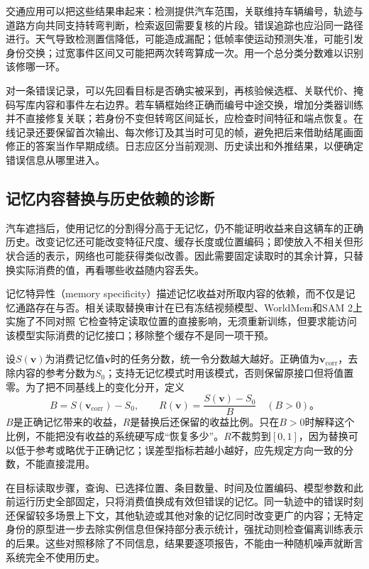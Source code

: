 交通应用可以把这些结果串起来：检测提供汽车范围，关联维持车辆编号，轨迹与道路方向共同支持转弯判断，检索返回需要复核的片段。错误追踪也应沿同一路径进行。天气导致检测置信降低，可能造成漏配；低帧率使运动预测失准，可能引发身份交换；过宽事件区间又可能把两次转弯算成一次。用一个总分类分数难以识别该修哪一环。

对一条错误记录，可以先回看目标是否确实被采到，再核验候选框、关联代价、掩码写库内容和事件左右边界。若车辆框始终正确而编号中途交换，增加分类器训练并不直接修复关联；若身份不变但转弯区间延长，应检查时间特征和端点恢复。在线记录还要保留首次输出、每次修订及其当时可见的帧，避免把后来借助结尾画面修正的答案当作早期成绩。日志应区分当前观测、历史读出和外推结果，以便确定错误信息从哪里进入。

\subsection{记忆内容替换与历史依赖的诊断}
\label{sec:vision-video-memory-specificity}

汽车遮挡后，使用记忆的分割得分高于无记忆，仍不能证明收益来自这辆车的正确历史。改变记忆还可能改变特征尺度、缓存长度或位置编码；即使放入不相关但形状合适的表示，网络也可能获得类似改善。因此需要固定读取时的其余计算，只替换实际消费的值，再看哪些收益随内容丢失。

记忆特异性（memory specificity）描述记忆收益对所取内容的依赖，而不仅是记忆通路存在与否。相关读取替换审计在已有冻结视频模型、WorldMem和SAM 2上实施了不同对照 它检查特定读取位置的直接影响，无须重新训练，但要求能访问该模型实际消费的记忆接口；移除整个缓存不是同一项干预。

设$S(\bm{v})$为消费记忆值$\bm{v}$时的任务分数，统一令分数越大越好。正确值为$\bm{v}_{\mathrm{corr}}$，去除内容的参考分数为$S_0$；支持无记忆模式时用该模式，否则保留原接口但将值置零。为了把不同基线上的变化分开，定义
\begin{equation}
  B=S(\bm{v}_{\mathrm{corr}})-S_0,\qquad
  R(\bm{v})=\frac{S(\bm{v})-S_0}{B}\quad(B>0)\text{。}
  \label{eq:vision-video-memory-recovery}
\end{equation}
$B$是正确记忆带来的收益，$R$是替换后还保留的收益比例。只在$B>0$时解释这个比例，不能把没有收益的系统硬写成“恢复多少”。$R$不裁剪到$[0,1]$，因为替换可以低于参考或略优于正确记忆；误差型指标若越小越好，应先规定方向一致的分数，不能直接混用。

在目标读取步骤，查询、已选择位置、条目数量、时间及位置编码、模型参数和此前运行历史全部固定，只将消费值换成有效但错误的记忆。同一轨迹中的错误时刻还保留较多场景上下文，其他轨迹或其他对象的记忆同时改变更广的内容；无特定身份的原型进一步去除实例信息但保持部分表示统计，强扰动则检查偏离训练表示的后果。这些对照移除了不同信息，结果要逐项报告，不能由一种随机噪声就断言系统完全不使用历史。

